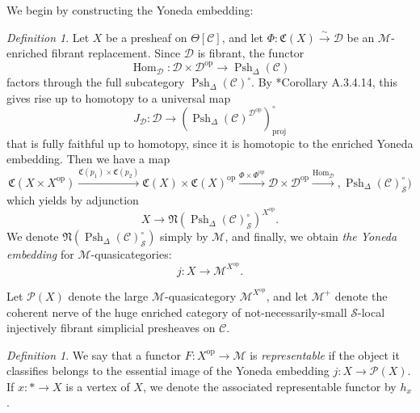 \documentclass{amsart}
\numberwithin{equation}{section}
\theoremstyle{plain}   %
\theoremstyle{remark}
\newtheorem{defn}[subsection]{Definition}
\theoremstyle{plain}
\DeclareMathOperator{\Psh}{Psh}
\newcommand{\op}{\ensuremath{\mathrm{op}}}
\DeclareMathOperator{\Hom}{Hom}
\newcommand{\C}{\ensuremath{\mathcal{C}}}
\newcommand{\M}{\ensuremath{\mathcal{M}}}
\newcommand{\Pre}{\ensuremath{\mathcal{P}}}
\newcommand{\setS}{\ensuremath{\mathscr{S}}}
\begin{document}
We begin by constructing the Yoneda embedding:
\begin{defn}
	Let \(X\) be a presheaf on \(\Theta[\C]\), and let \(\Phi:\mathfrak{C}(X) \xrightarrow{\sim} \mathcal{D}\) be an \(\M\)-enriched fibrant replacement.  Since \(\mathcal{D}\) is fibrant, the functor
	\[\Hom_\mathcal{D}: \mathcal{D}\times \mathcal{D}^\op \to \Psh_\Delta(\C)\]
	factors through the full subcategory \(\Psh_\Delta(\C)^\circ\).  By \cite{htt}*{Corollary A.3.4.14}, this gives rise up to homotopy to a universal map
	\[J_\mathcal{D}:\mathcal{D}\to \left(\Psh_\Delta(\C)^{\mathcal{D}^\op}\right)_\mathrm{proj}^\circ\]
	that is fully faithful up to homotopy, since it is homotopic to the enriched Yoneda embedding. 
	Then we have a map
	\[\mathfrak{C}(X\times X^\op) \xrightarrow{\mathfrak{C}(p_1) \times \mathfrak{C}(p_2)} \mathfrak{C}(X) \times \mathfrak{C}(X)^\op \xrightarrow{\Phi \times \Phi^\op} \mathcal{D}\times \mathcal{D}^\op \xrightarrow{\Hom_{\mathcal{D}}}, \Psh_\Delta(\C)_\setS^\circ)\]
	which yields by adjunction
	\[X \to \mathfrak{N}(\Psh_\Delta(\C)_\setS^\circ)^{X^\op}.\]
	We denote \(\mathfrak{N}(\Psh_\Delta(\C)_\setS^\circ)\) simply by \(\M\), and finally, we obtain \emph{the Yoneda embedding} for \(\M\)-quasicategories:
	\[j:X\to \M^{X^\op}.\]
\end{defn}

Let \(\Pre(X)\) denote the large \(\M\)-quasicategory \(\M^{X^\op}\), and let \(\M^+\) denote the coherent nerve of the huge enriched category of not-necessarily-small \(\setS\)-local injectively fibrant simplicial presheaves on \(\C\).  

\begin{defn} We say that a functor \(F:X^\op \to \M\) is \emph{representable} if the object it classifies belongs to the essential image of the Yoneda embedding \(j:X\to \Pre(X)\).  If \(x:\ast\to X\) is a vertex of \(X\), we denote the associated representable functor by \(h_x\).  
\end{defn}
\end{document}
